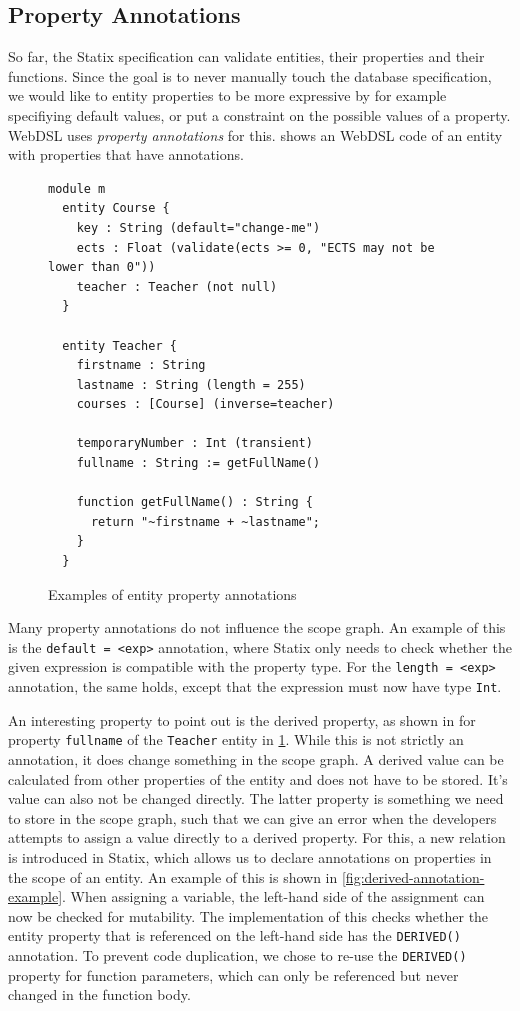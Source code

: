     \subsection{Property Annotations}

      So far, the Statix specification can validate entities, their properties and their functions. Since the goal is to never manually touch the database specification, we would like to entity properties to be more expressive by for example specifiying default values, or put a constraint on the possible values of a property. WebDSL uses \textit{property annotations} for this.  shows an WebDSL code of an entity with properties that have annotations.

      \begin{figure}
        \begin{verbatim}
module m
  entity Course {
    key : String (default="change-me")
    ects : Float (validate(ects >= 0, "ECTS may not be lower than 0"))
    teacher : Teacher (not null)
  }

  entity Teacher {
    firstname : String
    lastname : String (length = 255)
    courses : [Course] (inverse=teacher)
    
    temporaryNumber : Int (transient)
    fullname : String := getFullName()

    function getFullName() : String {
      return "~firstname + ~lastname";
    }
  }
        \end{verbatim}
        \caption{\label{fig:webdsl-properties-example}Examples of entity property annotations}
      \end{figure}

      Many property annotations do not influence the scope graph. An example of this is the \texttt{default = <exp>} annotation, where Statix only needs to check whether the given expression is compatible with the property type. For the \texttt{length = <exp>} annotation, the same holds, except that the expression must now have type \texttt{Int}.

      An interesting property to point out is the derived property, as shown in for property \texttt{fullname} of the \texttt{Teacher} entity in \cref{fig:webdsl-properties-example}. While this is not strictly an annotation, it does change something in the scope graph. A derived value can be calculated from other properties of the entity and does not have to be stored. It's value can also not be changed directly. The latter property is something we need to store in the scope graph, such that we can give an error when the developers attempts to assign a value directly to a derived property. For this, a new relation is introduced in Statix, which allows us to declare annotations on properties in the scope of an entity. An example of this is shown in \cref{fig:derived-annotation-example}. When assigning a variable, the left-hand side of the assignment can now be checked for mutability. The implementation of this checks whether the entity property that is referenced on the left-hand side has the \texttt{DERIVED()} annotation. To prevent code duplication, we chose to re-use the \texttt{DERIVED()} property for function parameters, which can only be referenced but never changed in the function body.

